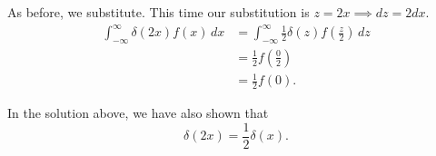 \begin{solution}
    As before, we substitute. This time our substitution is
    $z = 2x \implies dz=2dx$.
    \begin{align*} 
        \int_{-\infty}^{\infty} \delta(2x) f(x) \,dx
        &= \int_{-\infty}^{\infty} \frac12 \delta(z) f\left(\frac z2\right) \,dz \\
        &= \frac12 f\left(\frac02\right) \\
        &= \frac12 f(0).
    \end{align*}
\end{solution}

\begin{remark}
    In the solution above, we have also shown that 
    \[
        \delta(2x) = \frac12 \delta(x).
    \]
\end{remark}
